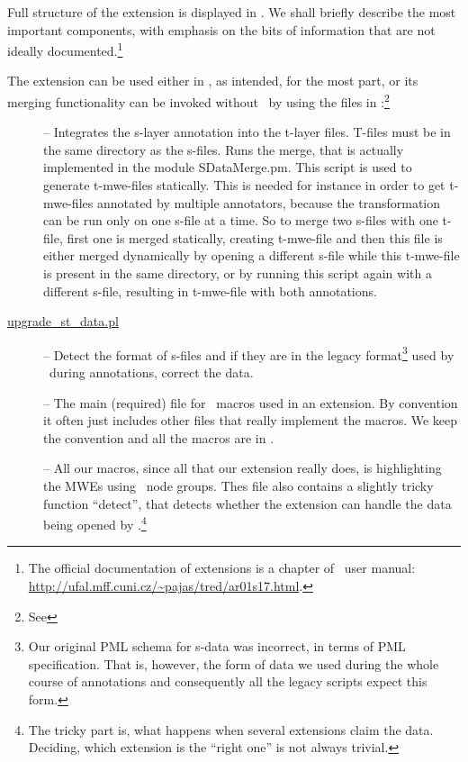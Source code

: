 Full structure of the extension is displayed in . We shall briefly describe the most important components, with emphasis on the bits of information that are not ideally documented.\footnote{The official documentation of extensions is a chapter of \tred\ user manual: \url{http://ufal.mff.cuni.cz/~pajas/tred/ar01s17.html}.}

The extension can be used either in \tred, as intended, for the most part, or its merging functionality can be invoked without \tred\ by using the files in :\footnote{See }

\begin{description}

\item [] -- Integrates the s-layer annotation into the t-layer files. T-files must be in the same directory as the s-files. Runs the merge, that is actually implemented in the module SDataMerge.pm. This script is used to generate t-mwe-files statically. This is needed for instance in order to get t-mwe-files annotated by multiple annotators, because the transformation can be run only on one s-file at a time. So to merge two s-files with one t-file, first one is merged statically, creating t-mwe-file and then this file is either merged dynamically by opening a different s-file while this t-mwe-file is present in the same directory, or by running this script again with a different s-file, resulting in t-mwe-file with both annotations.

\item [\url{upgrade_st_data.pl}] -- Detect the format of s-files and if they are in the legacy format\footnote{%
Our original PML schema for s-data was incorrect, in terms of PML specification. That is, however, the form of data we used during the whole course of annotations and consequently all the legacy scripts expect this form.}%
 used by \seman\ during annotations, correct the data. 

\item [] -- The main (required) file for \tred\ macros used in an extension. By convention it often just includes other files that really implement the macros. We keep the convention and all the macros are in .

\item [] -- All our macros, since all that our extension really does, is highlighting the MWEs using \tred\ node groups. Thes file also contains a slightly tricky function ``detect'', that detects whether the extension can handle the data being opened by \tred.\footnote{The tricky part is, what happens when several extensions claim the data. Deciding, which extension is the ``right one'' is not always trivial.}


\end{description}
